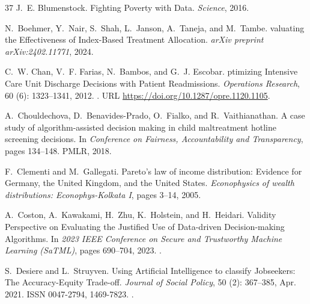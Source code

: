 \documentclass{article} %
\begin{document}
\begin{thebibliography}{37}
J.~E. Blumenstock.
\newblock Fighting {P}overty with {D}ata.
\newblock \emph{Science}, 2016.

N.~Boehmer, Y.~Nair, S.~Shah, L.~Janson, A.~Taneja, and M.~Tambe.
valuating the {E}ffectiveness of {I}ndex-{B}ased {T}reatment {A}llocation.
\newblock \emph{arXiv preprint arXiv:2402.11771}, 2024.

C.~W. Chan, V.~F. Farias, N.~Bambos, and G.~J. Escobar.
ptimizing {I}ntensive {C}are {U}nit {D}ischarge {D}ecisions with {P}atient {R}eadmissions.
\newblock \emph{Operations Research}, 60 (6): 1323--1341, 2012.
\newblock {}.
\newblock URL \url{https://doi.org/10.1287/opre.1120.1105}.

A.~Chouldechova, D.~Benavides-Prado, O.~Fialko, and R.~Vaithianathan.
\newblock A case study of algorithm-assisted decision making in child maltreatment hotline screening decisions.
\newblock In \emph{Conference on Fairness, Accountability and Transparency}, pages 134--148. PMLR, 2018.

F.~Clementi and M.~Gallegati.
\newblock Pareto’s law of income distribution: {E}vidence for {G}ermany, the {U}nited {K}ingdom, and the {U}nited {S}tates.
\newblock \emph{Econophysics of wealth distributions: Econophys-Kolkata I}, pages 3--14, 2005.

A.~Coston, A.~Kawakami, H.~Zhu, K.~Holstein, and H.~Heidari.
 {V}alidity {P}erspective on {E}valuating the {J}ustified {U}se of {D}ata-driven {D}ecision-making {A}lgorithms.
\newblock In \emph{2023 IEEE Conference on Secure and Trustworthy Machine Learning (SaTML)}, pages 690--704, 2023.
\newblock {}.

S.~Desiere and L.~Struyven.
\newblock Using {{Artificial Intelligence}} to classify {{Jobseekers}}: {{The Accuracy-Equity Trade-off}}.
\newblock \emph{Journal of Social Policy}, 50 (2): 367--385, Apr. 2021.
\newblock ISSN 0047-2794, 1469-7823.
\newblock {}.


\end{thebibliography}
\end{document}
